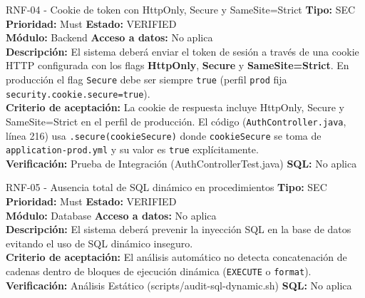 \documentclass[11pt,a4paper]{article}
\begin{document}
\begin{requisito}{RNF-04 - Cookie de token con HttpOnly, Secure y SameSite=Strict}
    \textbf{Tipo:} SEC \quad \textbf{Prioridad:} Must \quad \textbf{Estado:} VERIFIED \\[0.2cm]
    \textbf{Módulo:} Backend \quad \textbf{Acceso a datos:} No aplica \\[0.2cm]
    \textbf{Descripción:} El sistema deberá enviar el token de sesión a través de una cookie HTTP configurada con los flags \textbf{HttpOnly}, \textbf{Secure} y \textbf{SameSite=Strict}. En producción el flag \texttt{Secure} debe ser siempre \texttt{true} (perfil \texttt{prod} fija \texttt{security.cookie.secure=true}). \\[0.2cm]
    \textbf{Criterio de aceptación:} La cookie de respuesta incluye HttpOnly, Secure y SameSite=Strict en el perfil de producción. El código (\texttt{AuthController.java}, línea 216) usa \texttt{.secure(cookieSecure)} donde \texttt{cookieSecure} se toma de \texttt{application-prod.yml} y su valor es \texttt{true} explícitamente. \\[0.2cm]
    \textbf{Verificación:} Prueba de Integración (AuthControllerTest.java) \quad \textbf{SQL:} No aplica
\end{requisito}

\begin{requisito}{RNF-05 - Ausencia total de SQL dinámico en procedimientos}
    \textbf{Tipo:} SEC \quad \textbf{Prioridad:} Must \quad \textbf{Estado:} VERIFIED \\[0.2cm]
    \textbf{Módulo:} Database \quad \textbf{Acceso a datos:} No aplica \\[0.2cm]
    \textbf{Descripción:} El sistema deberá prevenir la inyección SQL en la base de datos evitando el uso de SQL dinámico inseguro. \\[0.2cm]
    \textbf{Criterio de aceptación:} El análisis automático no detecta concatenación de cadenas dentro de bloques de ejecución dinámica (\texttt{EXECUTE} o \texttt{format}). \\[0.2cm]
    \textbf{Verificación:} Análisis Estático (scripts/audit-sql-dynamic.sh) \quad \textbf{SQL:} No aplica
\end{requisito}
\end{document}
